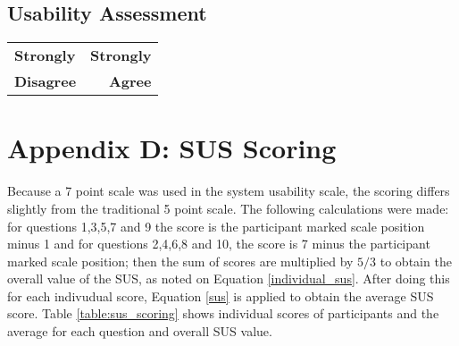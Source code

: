 \subsection*{Usability Assessment}

\hspace*{0.47\textwidth}%
\begin{tabularx}{0.5\textwidth}{@{}LR@{}}
    \textbf{Strongly} & \textbf{Strongly} \\
    \textbf{Disagree} & \textbf{Agree} \\
\end{tabularx}

\begin{enumerate}









\end{enumerate}

\clearpage

\section*[Appendix D]{Appendix D: SUS Scoring}\label{appendix:sus}

Because a 7 point scale was used in the system usability scale, the scoring
differs slightly from the traditional 5 point scale. The following calculations were made:
for questions 1,3,5,7 and 9 the score is the participant marked scale position minus 1 and
for questions 2,4,6,8 and 10, the score is 7 minus the participant marked scale position;
then the sum of scores are multiplied by $5/3$ to obtain the overall value of the SUS,
as noted on Equation \ref{individual_sus}. After doing this for each indivudual score,
Equation \ref{sus} is applied to obtain the average SUS score.
Table \ref{table:sus_scoring} shows individual scores of participants and the average for
each question and overall SUS value.

